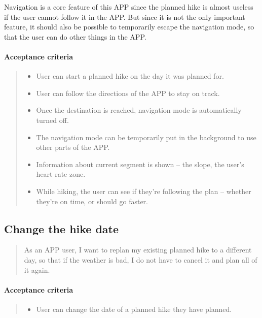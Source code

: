 Navigation is a core feature of this APP since the planned hike is almost useless if the user cannot follow it in the APP.
But since it is not the only important feature, it should also be possible to temporarily escape the navigation mode, so that the user can do other things in the APP.

\paragraph*{Acceptance criteria}
\begin{quote}
\begin{itemize}
    \item User can start a planned hike on the day it was planned for.
    \item User can follow the directions of the APP to stay on track.
    \item Once the destination is reached, navigation mode is automatically turned off.
    \item The navigation mode can be temporarily put in the background to use other parts of the APP.
    \item Information about current segment is shown -- the slope, the user's heart rate zone.
    \item While hiking, the user can see if they're following the plan -- whether they're on time, or should go faster.
\end{itemize}
\end{quote}

\subsection{Change the hike date}\label{US:map-hike-change}
\begin{quote}
As an APP user, I want to replan my existing planned hike to a different day, so that if the weather is bad, I do not have to cancel it and plan all of it again.
\end{quote}

\paragraph*{Acceptance criteria}
\begin{quote}
\begin{itemize}
    \item User can change the date of a planned hike they have planned.
\end{itemize}
\end{quote}


